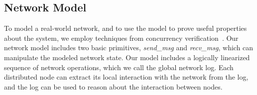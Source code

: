 

\subsection{Network Model}\label{subsec:network_modeling}

To model a real-world network, and to use the model to prove useful properties about the system, we employ techniques from concurrency verification~\cite{concurrency}. Our network model includes two basic primitives, \textit{send\_msg} and \textit{recv\_msg}, which can manipulate the modeled network state. Our model includes a logically linearized sequence of network operations, which we call the global network log. Each distributed node can extract its local interaction with the network from the log, and the log can be used to reason about the interaction between nodes.

